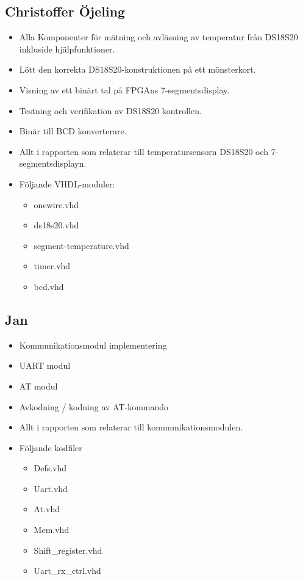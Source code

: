 \documentclass[a4paper]{scrartcl}
\begin{document}
\subsection{Christoffer Öjeling}
\begin{itemize}
	\item Alla Komponenter för mätning och avläsning av temperatur från DS18S20 inkluside hjälpfunktioner.
	\item Lött den korrekta DS18S20-konstruktionen på ett mönsterkort.
	\item Visning av ett binärt tal på FPGAns 7-segmentsdisplay.
	\item Testning och verifikation av DS18S20 kontrollen.
	\item Binär till BCD konverterare.
	\item Allt i rapporten som relaterar till temperatursensorn DS18S20 och 7-segmentsdisplayn.
	\item Följande VHDL-moduler:
	\begin{itemize}
		\item onewire.vhd
		\item ds18s20.vhd
		\item segment-temperature.vhd
		\item timer.vhd
		\item bcd.vhd
	\end{itemize}
\end{itemize}

\subsection{Jan}
\begin{itemize}
	\item Kommunikationsmodul implementering
	\item UART modul
	\item AT modul
	\item Avkodning / kodning av AT-kommando
	\item Allt i rapporten som relaterar till kommunikationsmodulen.
	\item Följande kodfiler
		\begin{itemize}
		\item Defs.vhd
		\item Uart.vhd
		\item At.vhd
		\item Mem.vhd
		\item Shift\_register.vhd
		\item Uart\_rx\_ctrl.vhd
		\end{itemize}
\end{itemize}
\end{document}
